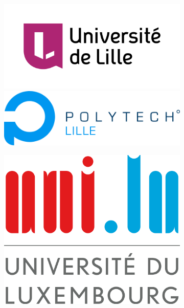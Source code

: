 	\begin{titlepage}

		\begin{figure}[t]
			\begin{subfigure}[h]{0.5\linewidth}
				\centering
				\includegraphics[scale=0.15]{Media/UniversiteLille.png}
				\hspace*{20pt}
				\includegraphics[scale=0.2]{Media/PolytechLille.png}
			\end{subfigure}
			\begin{subfigure}[h]{0.5\linewidth}
				\centering
				\includegraphics[scale=0.12]{Media/UniversiteLuxembourg.png}
			\end{subfigure}


\end{figure}
\end{titlepage}

